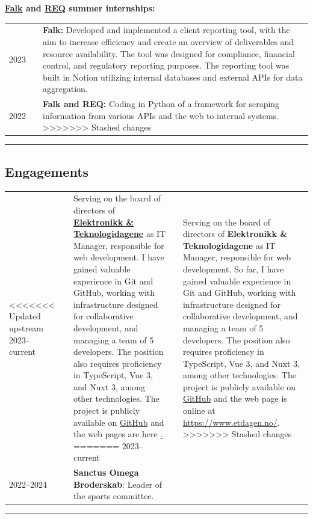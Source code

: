\documentclass[10pt]{article}
\newlength{\cw}
\newlength{\cwl}
\begin{document}
\textbf{\href{https://www.falkglobal.no/}{Falk} and \href{https://req.no/}{REQ} summer internships:}

\begin{tabular}{p{\cw} @{:}l p{\cwl}}
  2023 & & \textbf{Falk:} Developed and implemented a client reporting tool, with the aim to increase efficiency and create an overview of deliverables and resource availability.
  The tool was designed for compliance, financial control, and regulatory reporting purposes. The reporting tool was built in Notion utilizing internal databases and external APIs for data aggregation.\\
  2022 & & \textbf{Falk and REQ:} Coding in Python of a framework for scraping information from various APIs and the web to internal systems.
>>>>>>> Stashed changes
\end{tabular}

\vspace{0.1cm}
\hrule
\vspace{0.1cm}

\subsection*{Engagements}
\begin{tabular}{p{\cw} @{:}l p{\cwl}}
<<<<<<< Updated upstream
  2023--current & & Serving on the board of directors of \textbf{\href{https://www.etdagen.no/}{Elektronikk \& Teknologidagene}} as IT Manager, responsible for web development. I have gained valuable experience in Git and GitHub, working with infrastructure designed for collaborative development, and managing a team of 5 developers. The position also requires proficiency in TypeScript, Vue 3, and Nuxt 3, among other technologies. The project is publicly available on \href{https://github.com/et-dagen}{GitHub} and the web pages are here \href{https://www.etdagen.no/}. 
=======
  2023--current & & Serving on the board of directors of \textbf{Elektronikk \& Teknologidagene} as IT Manager, responsible for web development.
  So far, I have gained valuable experience in Git and GitHub, working with infrastructure designed for collaborative development, and managing a team of 5 developers.
  The position also requires proficiency in TypeScript, Vue 3, and Nuxt 3, among other technologies.
  The project is publicly available on \href{https://github.com/et-dagen}{GitHub} and the web page is online at \href{https://www.etdagen.no/}{https://www.etdagen.no/}.
>>>>>>> Stashed changes
  \\
  2022--2024 & & \textbf{Sanctus Omega Broderskab}: Leader of the sports committee.\\
\end{tabular}
\vspace{0.1cm}
\hrule
\vspace{0.1cm}
\end{document}
